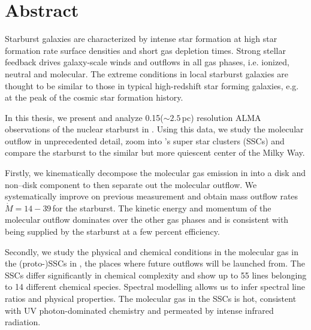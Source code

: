
\chapter*{Abstract}

\renewcommand{\abstractname}{Abstract}

\begingroup
\let\clearpage\relax
\let\cleardoublepage\relax
\let\cleardoublepage\relax



Starburst galaxies are characterized by intense star formation at high star formation rate surface densities and short gas depletion times. 
Strong stellar feedback drives galaxy-scale winds and outflows in all gas phases, i.e. ionized, neutral and molecular.
The extreme conditions in local starburst galaxies are thought to be similar to those in typical high-redshift star forming galaxies, e.g. at the peak of the cosmic star formation history.

In this thesis, we present and analyze 0.15\arcsec ($\sim2.5$\,pc) resolution ALMA  observations of the nuclear starburst in . 
Using this data, we study the molecular outflow in unprecedented detail, zoom into 's super star clusters (SSCs) and compare the starburst to the similar but more quiescent center of the Milky Way.

Firstly, we kinematically decompose the molecular gas emission in  into a disk and non--disk component to then separate out the molecular outflow. We systematically improve on previous measurement and obtain mass outflow rates $\dot{M} = 14-39$\,\Msunyr for the starburst. %
The kinetic energy and momentum of the molecular outflow dominates over the other gas phases and is consistent with being supplied by the starburst at a few percent efficiency.

Secondly, we study the physical and chemical conditions in the molecular gas in the (proto-)SSCs in , the places where future outflows will be launched from. The SSCs differ significantly in chemical complexity and show up to 55 lines belonging to 14 different chemical species. Spectral modelling allows us to infer spectral line ratios and physical properties.
The molecular gas in the SSCs is hot, consistent with UV photon-dominated chemistry and permeated by intense infrared radiation.

